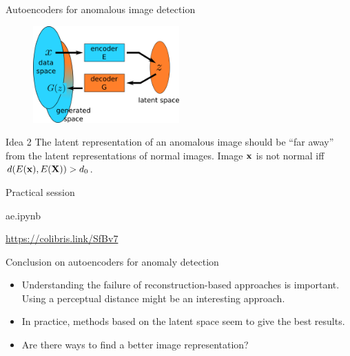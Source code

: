 \documentclass[xcolor=pdftex,dvipsnames,table,mathserif]{beamer}
\begin{document}
\begin{frame}{Autoencoders for anomalous image detection}

  \begin{figure}[ht]
    \centering
    \includegraphics[width=0.5\textwidth]{ae.png}
  \end{figure}

  \begin{block}{Idea 2}
    The latent representation of an anomalous image should be ``far away'' from the latent representations of normal images. Image $\mathbf{x}$ is not normal iff $d(E(\mathbf{x}), E(\mathbf{X})) > d_0$.
  \end{block}

\end{frame}

\begin{frame}{Practical session}

\begin{alertblock}{}
  ae.ipynb
\end{alertblock}

\begin{block}{}
\url{https://colibris.link/SfBv7}
\end{block}

\end{frame}


\begin{frame}{Conclusion on autoencoders for anomaly detection}

  \begin{itemize}
  \item Understanding the failure of reconstruction-based approaches is important. Using a perceptual distance might be an interesting approach.
  \item In practice, methods based on the latent space seem to give the best results.
  \item Are there ways to find a better image representation?
  \end{itemize}

\end{frame}
\end{document}
